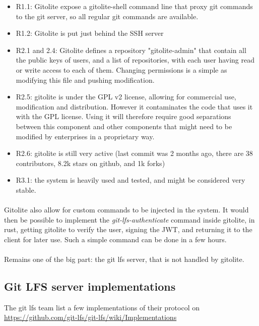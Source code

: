 \begin{itemize}
    \item R1.1: Gitolite expose a gitolite-shell command line that proxy git commands to the git server, so all regular git commands are available.
    \item R1.2: Gitolite is put just behind the SSH server
    \item R2.1 and 2.4: Gitolite defines a repository "gitolite-admin" that contain all the public keys of users, and a list of repositories, with each user having read or write access to each of them. Changing permissions is a simple as modifying this file and pushing modification. 
    \item R2.5: gitolite is under the GPL v2 license, allowing for commercial use, modification and distribution. However it contaminates the code that uses it with the GPL license. Using it will therefore require good separations between this component and other components that might need to be modified by enterprises in a proprietary way.
    \item R2.6: gitolite is still very active (last commit was 2 months ago, there are 38 contributors, 8.2k stars on github, and 1k forks)
    \item R3.1: the system is heavily used and tested, and might be considered very stable.
\end{itemize}

\paragraph{}
Gitolite also allow for custom commands to be injected in the system. It would then be possible to implement the \textit{git-lfs-authenticate} command inside gitolite, in rust, getting gitolite to verify the user, signing the JWT, and returning it to the client for later use. Such a simple command can be done in a few hours. 

\paragraph{}
Remains one of the big part: the git lfs server, that is not handled by gitolite.

\subsection{Git LFS server implementations}
The git lfs team list a few implementations of their protocol on \url{https://github.com/git-lfs/git-lfs/wiki/Implementations}

